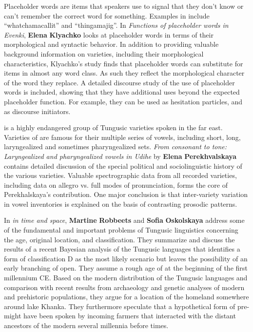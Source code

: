 \documentclass[output=paper,colorlinks,citecolor=brown]{langscibook}
\begin{document}
Placeholder words are items that speakers use to signal that they don’t know or can’t remember the correct word for something. Examples in  include “whatchamacallit” and “thingamajig”. In \textit{Functions of placeholder words in Evenki}, \textbf{Elena} \textbf{Klyachko} looks at placeholder words in terms of their morphological and syntactic behavior. In addition to providing valuable background information on  varieties, including their morphological characteristics, Klyachko’s study finds that placeholder words can substitute for items in almost any word class. As such they reflect the morphological character of the word they replace. A detailed discourse study of the use of placeholder words is included, showing that they have additional uses beyond the expected placeholder function. For example, they can be used as hesitation particles, and as discourse initiators.

 is a highly endangered group of Tungusic varieties spoken in the  far east. Varieties of  are famous for their multiple series of vowels, including short, long, laryngealized and sometimes pharyngealized sets. \textit{From consonant to tone: Laryngealized and pharyngealized vowels in Udihe} by \textbf{Elena} \textbf{Perekhvalskaya} contains detailed discussion of the special political and sociolinguistic history of the various  varieties. Valuable spectrographic data from all recorded varieties, including data on allegro vs. full modes of pronunciation, forms the core of Perekhalskaya’s contribution. One major conclusion is that inter-variety variation in vowel inventories is explained on the basis of contrasting prosodic patterns.

In \textit{ in time and space}, \textbf{Martine} \textbf{Robbeets} and \textbf{Sofia} \textbf{Oskolskaya} address some of the fundamental and important problems of Tungusic linguistics concerning the age, original location, and classification. They summarize and discuss the results of a recent Bayesian analysis of the Tungusic languages \citep{Oskolskayaetal2022} that identifies a form of classification D as the most likely scenario but leaves the possibility of an early branching of  open. They assume a rough age of  at the beginning of the first millennium CE. Based on the modern distribution of the Tungusic languages and comparison with recent results from archaeology and genetic analyses of modern and prehistoric populations, they argue for a location of the  homeland somewhere around lake Khanka. They furthermore speculate that a hypothetical form of pre- might have been spoken by incoming farmers that interacted with the distant ancestors of the modern  several millennia before  times.
\end{document}
